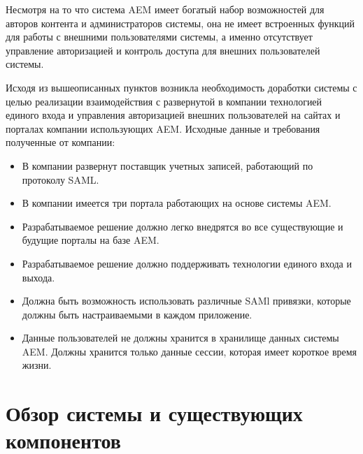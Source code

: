 Несмотря на то что система AEM имеет богатый набор возможностей для авторов контента и администраторов системы, она не имеет встроенных функций для работы с внешними пользователями системы, а именно отсутствует управление авторизацией и контроль доступа для внешних пользователей системы.

Исходя из вышеописанных пунктов возникла необходимость доработки системы с целью реализации взаимодействия с развернутой в компании технологией единого входа и управления авторизацией внешних пользователей на сайтах и порталах компании использующих AEM. Исходные данные и требования полученные от компании: 
\begin{itemize} 
\item В компании развернут поставщик учетных записей, работающий по протоколу SAML.
\item В компании имеется три портала работающих на основе системы AEM.
\item Разрабатываемое решение должно легко внедрятся во все существующие и будущие порталы на базе AEM.
\item Разрабатываемое решение должно поддерживать технологии единого входа и  выхода.
\item Должна быть возможность использовать различные SAMl привязки, которые должны быть настраиваемыми в каждом приложение.
\item Данные пользователей не должны хранится в хранилище данных системы AEM. Должны хранится только данные сессии, которая имеет короткое время жизни.
\end{itemize}

%
%

\section{Обзор системы и существующих компонентов}

